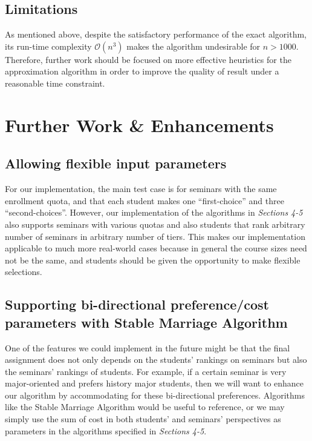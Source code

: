 \documentclass{article} %
\begin{document}
\subsection{Limitations}
    \par\qquad As mentioned above, despite the satisfactory performance of the exact algorithm, its run-time complexity $\mathcal{O}(n^3)$ makes the algorithm undesirable for $n>1000$. Therefore, further work should be focused on more effective heuristics for the approximation algorithm in order to improve the quality of result under a reasonable time constraint.

\section{Further Work \& Enhancements}

\subsection{Allowing flexible input parameters}
    \par\qquad For our implementation, the main test case is for seminars with the same enrollment quota, and that each student makes one ``first-choice'' and three ``second-choices''. However, our implementation of the algorithms in \emph{Sections 4-5} also supports seminars with various quotas and also students that rank arbitrary number of seminars in arbitrary number of tiers. This makes our implementation applicable to much more real-world cases because in general the course sizes need not be the same, and students should be given the opportunity to make flexible selections.

\subsection{Supporting bi-directional preference/cost parameters with Stable Marriage Algorithm}
   \par\qquad One of the features we could implement in the future might be that the final assignment does not only depends on the students' rankings on seminars but also the seminars' rankings of students. For example, if a certain seminar is very major-oriented and prefers history major students, then we will want to enhance our algorithm by accommodating for these bi-directional preferences. Algorithms like the Stable Marriage Algorithm would be useful to reference, or we may simply use the sum of cost in both students' and seminars' perspectives as parameters in the algorithms specified in \emph{Sections 4-5}.
   
\end{document}
